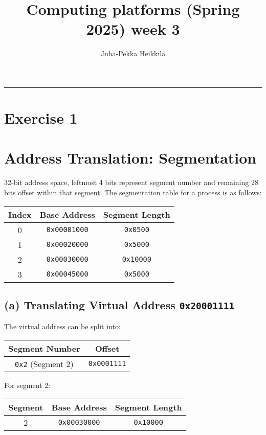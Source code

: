 \documentclass{article}
\title{Computing platforms (Spring 2025)\newline
week 3}
\author{Juha-Pekka Heikkilä}
\renewcommand{\maketitle}{%
  \begin{leftmark}
    \vspace*{\baselineskip} %



    \textbf{\fontsize{18}{36}\selectfont \thetitle} %

     \vspace{0.05cm} %
    \vspace{\baselineskip} %
     \rule{\textwidth}{0.4pt} %

   \end{leftmark}
}
\newcommand{\exercise}[1]{
    \section*{Exercise #1}
    \markboth{Exercise #1}{}
}
\begin{document}
\maketitle


\exercise{1}
\section*{Address Translation: Segmentation}

32-bit address space, leftmost 4 bits represent segment
number and remaining 28 bits offset within that segment.
The segmentation table for a process is as follows:

\bigskip
\begin{center}
\begin{tabular}{|c|c|c|}
\hline
\textbf{Index} & \textbf{Base Address} & \textbf{Segment Length} \\
\hline
0 & \texttt{0x00001000} & \texttt{0x0500} \\
1 & \texttt{0x00020000} & \texttt{0x5000} \\
2 & \texttt{0x00030000} & \texttt{0x10000} \\
3 & \texttt{0x00045000} & \texttt{0x5000} \\
\hline
\end{tabular}
\end{center}
\bigskip

\subsection*{(a) Translating Virtual Address \texttt{0x20001111}}

The virtual address can be split into:

\begin{center}
\begin{tabular}{|c|c|}
\hline
\textbf{Segment Number} & \textbf{Offset} \\
\hline
\texttt{0x2} (Segment 2) & \texttt{0x0001111} \\
\hline
\end{tabular}
\end{center}

For segment 2:

\begin{center}
\begin{tabular}{|c|c|c|}
\hline
\textbf{Segment} & \textbf{Base Address} & \textbf{Segment Length} \\
\hline
2 & \texttt{0x00030000} & \texttt{0x10000} \\
\hline
\end{tabular}
\end{center}
\end{document}
